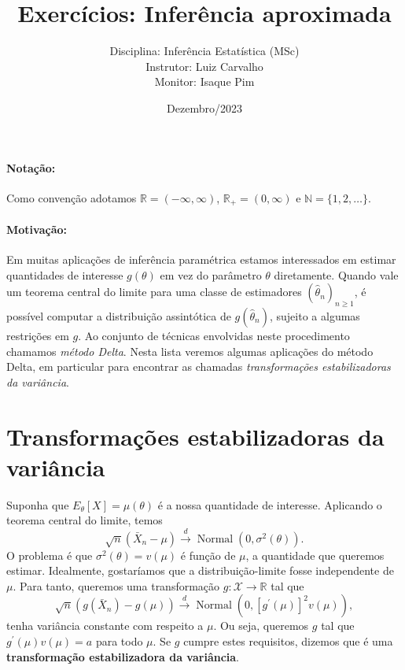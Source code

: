 \documentclass[a4paper,10pt, notitlepage]{report}
\title{Exercícios: Inferência aproximada}
\author{Disciplina: Inferência Estatística (MSc) \\ Instrutor: Luiz Carvalho \\ Monitor: Isaque Pim}
\date{Dezembro/2023}
\newcommand{\rpl}{\mathbb{R}_+}
\begin{document}
\maketitle


\paragraph{Notação:} Como convenção adotamos $\mathbb{R} = (-\infty, \infty)$, $\rpl = (0, \infty)$ e $\mathbb{N} = \{1, 2, \ldots \}$.

\paragraph{Motivação:} Em muitas aplicações de inferência paramétrica estamos interessados em estimar quantidades de interesse $g(\theta)$ em vez do parâmetro $\theta$ diretamente.
Quando vale um teorema central do limite para uma classe de estimadores $(\hat{\theta}_n)_{n\geq1}$, é possível computar a distribuição assintótica de $g(\hat{\theta}_n)$, sujeito a algumas restrições em $g$.
Ao conjunto de técnicas envolvidas neste procedimento chamamos \textit{método Delta}.
Nesta lista veremos algumas aplicações do método Delta, em particular para encontrar as chamadas \textit{transformações estabilizadoras da variância}.

\section*{Transformações estabilizadoras da variância}

Suponha que $E_\theta[X] = \mu(\theta)$ é a nossa quantidade de interesse.
 Aplicando o teorema central do limite, temos
 \begin{equation}
   \sqrt{n}\left(\bar{X}_n -\mu\right)  \xrightarrow{d} \operatorname{Normal}(0, \sigma^2(\theta)).
 \end{equation}
 O problema é que $\sigma^2(\theta) = v(\mu)$ é função de $\mu$, a quantidade que queremos estimar. 
 Idealmente, gostaríamos que a distribuição-limite fosse independente de $\mu$.
 Para tanto, queremos uma transformação $g : \mathcal{X} \to \mathbb{R}$ tal que
  \begin{equation}
   \sqrt{n}\left(g(\bar{X}_n) -g(\mu)\right)  \xrightarrow{d} \operatorname{Normal}\left(0, [g^\prime(\mu)]^2v(\mu)\right),
 \end{equation}
 tenha variância constante com respeito a $\mu$.
 Ou seja, queremos $g$ tal que $g^\prime(\mu)v(\mu) = a$ para todo $\mu$.
 Se $g$ cumpre estes requisitos, dizemos que é uma \textbf{transformação estabilizadora da variância}.
\end{document}
